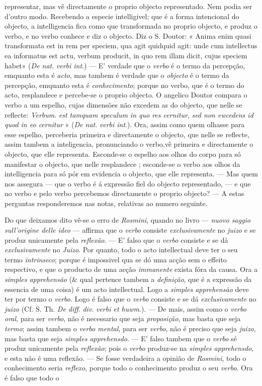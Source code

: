 representar, mas vê directamente o proprio objecto representado. Nem podia ser d'outro modo. Recebendo a especie intelligivel; que é a forma intencional do objecto, a intelligencia fica como que transformada no proprio objecto, e produz o verbo, e no verbo conhece e diz o objecto. Diz o S. Doutor: « Anima enim quasi transformata est in rem per speciem, qua agit quidquid agit: unde cum intellectus ea informatus est actu, verbum producit, in quo rem illam dicit, cujus speciem habet» (\emph{De nat}. \emph{verbi int}.) --- E' verdade que o \emph{verbo} é o termo da percepção, emquanto esta é \emph{acto}, mas tambem é verdade que o \emph{objecto} é o termo da percepção, emquanto esta é \emph{conhecimento}; porque no verbo, que é o termo do acto, resplandece e percebe-se o proprio objecto. O angelico Doutor compara o verbo a um espelho, cujas dimensões não excedem as do objecto, que nelle se reflecte: \emph{Verbum}. \emph{est tamquam speculum in quo res cernitur}, \emph{sed non ewcedens id quod in eo cernitur} » (\emph{De nat}. \emph{verbi int}.). Ora, assim como quem olhasse para esse espelho, perceberia primeira e directamente o objecto, que nelle se reflecte, assim tambem a inteligencia, pronunciando o verbo,vê primeira e directamente o objecto, que elle representa. Esconde-se o espelho aos olhos do corpo para só manifestar o objecto, que nelle resplandece ; esconde-se o verbo aos olhos da intelligencia para só pór em evidencia o objecto, que elle representa. --- Mas quem nos assegura --- que o verbo é á expressão fiel do objecto representado, --- e que no verbo e pelo verbo percebemos directamente o proprio objecto? --- A estas perguntas responderemos nas notas, relativas ao numero seguinte.\par Do que deixamos dito vê-se o erro de \emph{Rosmini}, quando no livro --- \emph{nuovo saggio sull'origine delle ideo} --- affirma que o \emph{verbo} consiste \emph{exclusivamente} no \emph{juizo} e se produz unicamente pela \emph{reflexão}. --- E' falso que o \emph{verbo} consiste e se dà \emph{exclusivamente} no \emph{Juizo}. Por quanto, todo o acto intellectual deve ter o seu termo \emph{intrinseco}; porque é impossivel qua se dó uma acção sem o effeito respectivo, e que o producto de uma acção \emph{immanente} exista fóra da causa. Ora a \emph{simples apprehensão} (\& qual pertence tambem a \emph{definição}, que é a expressão da essencia de uma coisa) é um acto intellectual. Logo a \emph{simples apprehensão} deve ter por termo o \emph{verbo}. Logo é falso que o \emph{verbo} consiste e se dá \emph{exclusivamente} no \emph{juizo} (Cf. S. Th. \emph{De diff}. \emph{div}. \emph{verbi et huwm}.). --- De mais, assim como o \emph{verbo oral}, para ser \emph{verbo}, não é necessario que seja \emph{proposição}, mas basta que seja \emph{termo}; assim tambem o \emph{verbo mental}, para ser \emph{verbo}, não é preciso que seja \emph{juizo}, mas basta que seja \emph{simples apprehensdo}. --- E' falso tambem que o \emph{verbo} sé produz unicamente pela \emph{reflexão}; pois o \emph{verbo} produz-se na \emph{simples apprehensdo}, e esta não é uma reflexão. --- Se fosse verdadeira a opinião de \emph{Rosmini}, todo o conhecimento seria \emph{reflexo}, porque todo o conhecimento produz o seu \emph{verbo}. Ora é falso que todo o 